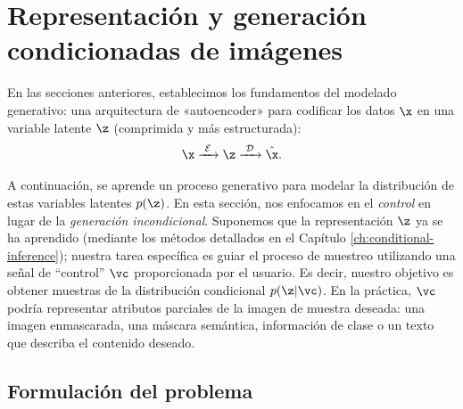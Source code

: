 \documentclass[../../book-main_es.tex]{subfiles}
\begin{document}
\section{Representación y generación condicionadas de imágenes}
\label{sec:cond_gen}

En las secciones anteriores, establecimos los fundamentos
del modelado generativo: una arquitectura de «autoencoder» para codificar los datos $\x$ en una variable latente $\z$ (comprimida y más estructurada):
\begin{equation}
\x\xrightarrow{\hspace{1mm} \mathcal{E} \hspace{1mm}} \z
\xrightarrow{\hspace{1mm} \mathcal{D} \hspace{1mm}} \hat{\x}.
\end{equation}

A continuación, se aprende un proceso generativo para modelar la distribución de estas variables 
latentes $p(\z)$. En esta sección, nos enfocamos en el \textit{control} en lugar de la 
\textit{generación incondicional}. Suponemos que la representación $\z$ ya se ha aprendido (mediante los métodos 
detallados en el Capítulo \ref{ch:conditional-inference}); nuestra tarea específica es guiar 
el proceso de muestreo utilizando una señal de ``control'' $\vc$ proporcionada por el usuario. Es 
decir, nuestro objetivo es obtener muestras de la distribución condicional $p(\z | \vc)$. En la 
práctica, $\vc$ podría representar atributos parciales de la imagen de muestra deseada: una imagen 
enmascarada, una máscara semántica, información de clase o un texto que describa el contenido deseado.

\subsection{Formulación del problema}
\label{subsec:cond_problem}
\end{document}
